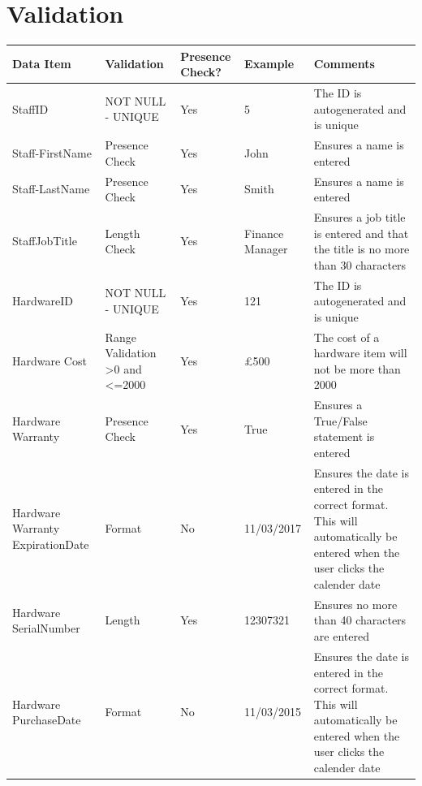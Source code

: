 \section{Validation}

\begin{center}
    \begin{longtable}{|p{2.5cm}|p{2cm}|p{3cm}|p{3cm}|p{3cm}|}
        \hline
        \textbf{Data Item} & \textbf{Validation} & \textbf{Presence Check?} & \textbf{Example} & \textbf{Comments} \\ \hline
StaffID                              & NOT NULL - UNIQUE        &  Yes & 5        & The ID is autogenerated and is unique  \\ \hline
Staff-FirstName                      & Presence Check                   & Yes        & John                  &  Ensures a name is entered                      \\ \hline
Staff-LastName                       & Presence Check               & Yes            & Smith                 &   Ensures a name is entered                     \\ \hline
StaffJobTitle			&   Length Check 			&Yes & Finance Manager		&Ensures a job title is entered and that the title is no more than 30 characters		\\ \hline
HardwareID                         &   NOT NULL - UNIQUE       &Yes                & 121                   &The ID is autogenerated and is unique \\ \hline
Hardware Cost                     &   Range Validation \textgreater0 and \textless=2000            &Yes                        & £500                  &  The cost of a hardware item will not be more than 2000                     \\ \hline
Hardware Warranty                    & Presence Check            &Yes               & True                  & Ensures a True/False statement is entered                      \\ \hline
Hardware Warranty ExpirationDate           & Format                      &No             & 11/03/2017               &   Ensures the date is entered in the correct format. This will automatically be entered when the user clicks the calender date                    \\ \hline
Hardware SerialNumber              & Length                 &Yes                  & 12307321              &      Ensures no more than 40 characters are entered                 \\ \hline
Hardware PurchaseDate               & Format                 &No                  & 11/03/2015              & Ensures the date is entered in the correct format. This will automatically be entered when the user clicks the calender date                       \\ \hline

\end{longtable}
\end{center}
